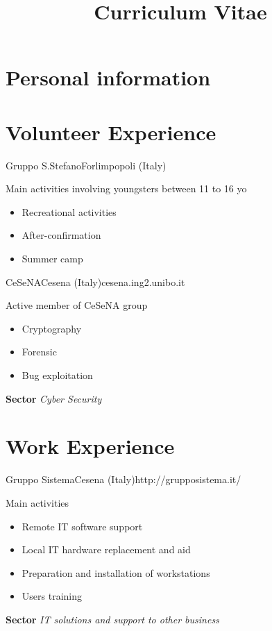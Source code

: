 \documentclass[11pt,a4paper,sans]{moderncv}
\title{Curriculum Vitae}
\begin{document}
\vspace*{-2cm}
\maketitle
\vspace*{-1cm}

\section{Personal information}

\section{Volunteer Experience}

{\newline Gruppo S.Stefano}{Forlimpopoli (Italy)}{}{
	Main activities involving youngsters between 11 to 16 yo
	\begin{itemize}
	\item Recreational activities
	\item After-confirmation
	\item Summer camp
	\end{itemize}
}

{\newline CeSeNA}{Cesena (Italy)}{cesena.ing2.unibo.it}{
	Active member of CeSeNA group
	\begin{itemize}
	\item Cryptography
	\item Forensic
	\item Bug exploitation
	\end{itemize}
	\textbf{Sector}
	\textit{Cyber Security}
}

\section{Work Experience}

{\newline Gruppo Sistema}{Cesena (Italy)}{http://grupposistema.it/}{
	Main activities
	\begin{itemize}
	\item Remote IT software support
	\item Local IT hardware replacement and aid
	\item Preparation and installation of workstations
	\item Users training
	\end{itemize}
	\textbf{Sector}
	\textit{IT solutions and support to other business}
}
\end{document}
